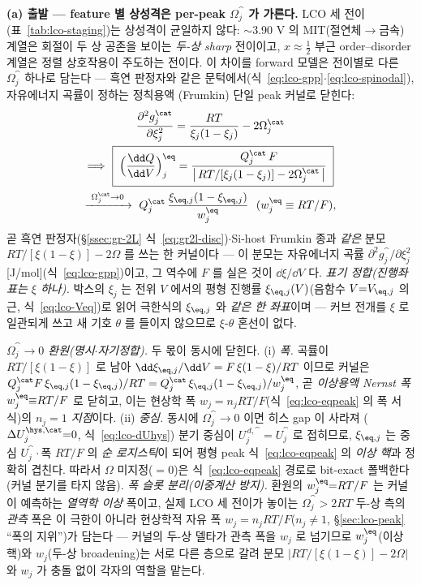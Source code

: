\textbf{(a) 출발 --- feature 별 상성격은 per-peak $\Omega_j^\cat$ 가 가른다.} LCO 세 전이(표~\ref{tab:lco-staging})는
상성격이 균일하지 않다: $\sim$3.90 V 의 MIT(절연체$\to$금속) 계열은 회절이 두 상 공존을 보이는 \emph{두-상 sharp}
전이이고\cite{reimers1992,menetrier1999}, $x\approx\tfrac12$ 부근 order--disorder 계열은 정렬 상호작용이 주도하는
전이다\cite{vanderven1998}. 이 차이를 forward 모델은 전이별로 다른 $\Omega_j^\cat$ 하나로 담는다 --- 흑연
판정자와 같은 문턱에서(식~\eqref{eq:lco-gpp}$\cdot$\eqref{eq:lco-spinodal}), 자유에너지 곡률이 정하는 정칙용액
(Frumkin) 단일 peak 커널로 닫힌다:
\begin{multline}
\frac{\partial^2 g_j^\cat}{\partial\xi_j^2}=\frac{RT}{\xi_j(1-\xi_j)}-2\Omega_j^\cat \\
\Longrightarrow\
\boxed{\;\Big(\frac{\dd Q}{\dd V}\Big)^\eq_j=\frac{Q_j^\cat\,F}{\big|\,RT/[\xi_j(1-\xi_j)]-2\Omega_j^\cat\,\big|}\;} \\
\xrightarrow[\ ]{\ \Omega_j^\cat\to0\ }\
Q_j^\cat\,\frac{\xi_{\eq,j}(1-\xi_{\eq,j})}{w_j^{\eq}}\ \ (w_j^{\eq}\equiv RT/F),
\label{eq:lcoomega-kernel}
\end{multline}
곧 흑연 판정자(\S\ref{ssec:gr-2L} 식~\eqref{eq:gr2l-disc})$\cdot$Si-host Frumkin 종과 \emph{같은} 분모
$RT/[\xi(1-\xi)]-2\Omega$ 를 쓰는 한 커널이다 --- 이 분모는 자유에너지 곡률 $\partial^2 g_j^\cat/\partial\xi_j^2$
[J/mol](식~\eqref{eq:lco-gpp})이고, 그 역수에 $F$ 를 실은 것이 $\dd\xi/\dd V$ 다. \emph{표기 정합(진행좌표는 $\xi$
하나).} 박스의 $\xi_j$ 는 전위 $V$ 에서의 평형 진행률 $\xi_{\eq,j}(V)$(음함수 $V{=}V_{\eq,j}$ 의 근,
식~\eqref{eq:lco-Veq})로 읽어 극한식의 $\xi_{\eq,j}$ 와 \emph{같은 한 좌표}이며 --- 커브 전개를 $\xi$ 로 일관되게
쓰고 새 기호 $\theta$ 를 들이지 않으므로 $\xi$-$\theta$ 혼선이 없다.

\emph{$\Omega_j^\cat\to0$ 환원(명시$\cdot$자기정합).} 두 몫이 동시에 닫힌다. (i) \emph{폭.} 곡률이
$RT/[\xi(1-\xi)]$ 로 남아 $\dd\xi_{\eq,j}/\dd V=F\,\xi(1-\xi)/RT$ 이므로 커널은
$Q_j^\cat F\,\xi_{\eq,j}(1-\xi_{\eq,j})/RT=Q_j^\cat\,\xi_{\eq,j}(1-\xi_{\eq,j})/w_j^{\eq}$, 곧 \emph{이상용액
Nernst 폭} $w_j^{\eq}{\equiv}RT/F$ 로 닫히고, 이는 현상학 폭 $w_j{=}n_jRT/F$(식~\eqref{eq:lco-eqpeak} 의 폭
서식)의 \emph{$n_j{=}1$ 지점}이다. (ii) \emph{중심.} 동시에 $\Omega_j^\cat\!\to\!0$ 이면 히스 gap 이 사라져
($\Delta U_j^{\hys,\cat}{=}0$, 식~\eqref{eq:lco-dUhys}) 분기 중심이 $U_j^{\,d,\cat}{=}U_j^\cat$ 로 접히므로,
$\xi_{\eq,j}$ 는 중심 $U_j^\cat\cdot$폭 $RT/F$ 의 \emph{순 로지스틱}이 되어 평형 peak 식~\eqref{eq:lco-eqpeak} 의
\emph{이상 핵}과 정확히 겹친다. 따라서 $\Omega$ 미지정($=0$)은 식~\eqref{eq:lco-eqpeak} 경로로 bit-exact
폴백한다(커널 분기를 타지 않음). \emph{폭 슬롯 분리(이중계산 방지).} 환원의 $w_j^{\eq}{=}RT/F$ 는 커널이
예측하는 \emph{열역학 이상} 폭이고, 실제 LCO 세 전이가 놓이는 $\Omega_j^\cat>2RT$ 두-상 측의 \emph{관측} 폭은
이 극한이 아니라 현상학적 자유 폭 $w_j{=}n_jRT/F$($n_j\neq1$, \S\ref{sec:lco-peak} ``폭의 지위'')가 담는다 ---
커널의 두-상 델타가 관측 폭을 $w_j$ 로 넘기므로 $w_j^{\eq}$(이상 핵)와 $w_j$(두-상 broadening)는 서로 다른
층으로 갈려 분모 $|RT/[\xi(1-\xi)]-2\Omega|$ 와 $w_j$ 가 충돌 없이 각자의 역할을 맡는다.

